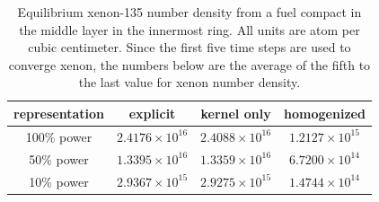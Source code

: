 \documentclass[letterpaper]{physor2024}
\begin{document}
\begin{table}[!h]
    \centering
    \caption{Equilibrium xenon-135 number density from a fuel compact in the middle layer in the innermost ring. All units are atom per cubic centimeter. Since the first five time steps are used to converge xenon, the numbers below are the average of the fifth to the last value for xenon number density.}
    \begin{tabular}{|c|c|c|c|} \hline
     representation & explicit & kernel only & homogenized \\ \hline
    100\% power & $2.4176\times 10^{16}$ & $2.4088\times 10^{16}$ & $1.2127\times 10^{15}$ \\  \hline
    50\% power & $1.3395\times 10^{16}$ & $1.3359\times 10^{16}$ & $6.7200\times 10^{14}$ \\ \hline
    10\% power & $2.9367\times 10^{15}$ & $2.9275\times 10^{15}$ & $1.4744\times 10^{14}$ \\ \hline
    \end{tabular}
    \label{tab:xenons}
\end{table}
\end{document}
